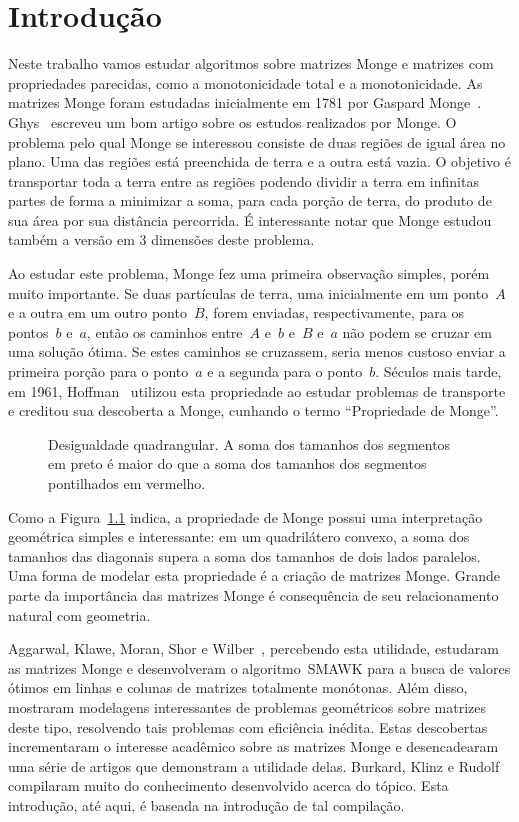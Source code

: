 \chapter{Introdução}
\label{Introducao}

Neste trabalho vamos estudar algoritmos sobre matrizes Monge e matrizes com propriedades parecidas, como a monotonicidade total e a monotonicidade. As matrizes Monge foram estudadas inicialmente em 1781 por Gaspard Monge~\cite{Monge:1781}. Ghys~\cite{Ghys:2012} escreveu um bom artigo sobre os estudos realizados por Monge. O problema pelo qual Monge se interessou consiste de duas regiões de igual área no plano. Uma das regiões está preenchida de terra e a outra está vazia. O objetivo é transportar toda a terra entre as regiões podendo dividir a terra em infinitas partes de forma a minimizar a soma, para cada porção de terra, do produto de sua área por sua distância percorrida. É interessante notar que Monge estudou também a versão em 3 dimensões deste problema.

Ao estudar este problema, Monge fez uma primeira observação simples, porém muito importante. Se duas partículas de terra, uma inicialmente em um ponto~$A$ e a outra em um outro ponto~$B$, forem enviadas, respectivamente, para os pontos~$b$ e~$a$, então os caminhos entre~$A$ e~$b$ e~$B$ e~$a$ não podem se cruzar em uma solução ótima. Se estes caminhos se cruzassem, seria menos custoso enviar a primeira porção para o ponto~$a$ e a segunda para o ponto~$b$. Séculos mais tarde, em 1961, Hoffman~\cite{Hoffman:2003} utilizou esta propriedade ao estudar problemas de transporte e creditou sua descoberta a Monge, cunhando o termo ``Propriedade de Monge''.

\begin{figure}[h]
    \centering
    
    \caption{Desigualdade quadrangular. A soma dos tamanhos dos segmentos em preto é maior do que a soma dos tamanhos dos segmentos pontilhados em vermelho.} \label{Introducao:QI}
\end{figure}

Como a Figura~\ref{Introducao:QI} indica, a propriedade de Monge possui uma interpretação geométrica simples e interessante: em um quadrilátero convexo, a soma dos tamanhos das diagonais supera a soma dos tamanhos de dois lados paralelos. Uma forma de modelar esta propriedade é a criação de matrizes Monge. Grande parte da importância das matrizes Monge é consequência de seu relacionamento natural com geometria. 

Aggarwal, Klawe, Moran, Shor e Wilber~\cite{Aggarwal:1987}, percebendo esta utilidade, estudaram as matrizes Monge e desenvolveram o algoritmo~\textsc{SMAWK} para a busca de valores ótimos em linhas e colunas de matrizes totalmente monótonas. Além disso, mostraram modelagens interessantes de problemas geométricos sobre matrizes deste tipo, resolvendo tais problemas com eficiência inédita. Estas descobertas incrementaram o interesse acadêmico sobre as matrizes Monge e desencadearam uma série de artigos que demonstram a utilidade delas. Burkard, Klinz e Rudolf~\cite{Burkard:1996} compilaram muito do conhecimento desenvolvido acerca do tópico. Esta introdução, até aqui, é baseada na introdução de tal compilação.

